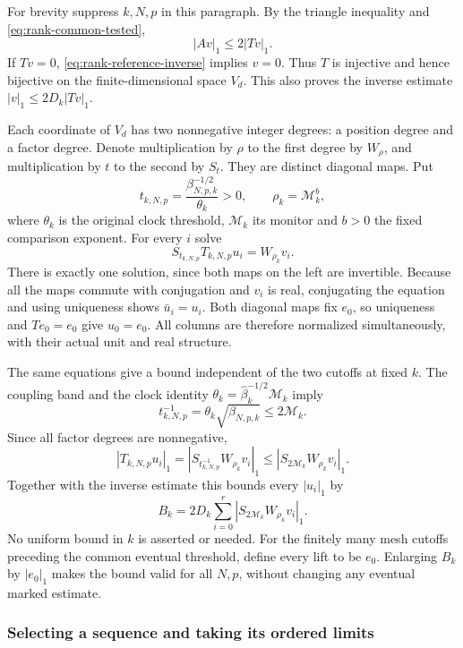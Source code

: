 For brevity suppress $k,N,p$ in this paragraph. By the triangle inequality
and \eqref{eq:rank-common-tested},
\[
                         |Av|_1\le2|Tv|_1.
\]
If $Tv=0$, \eqref{eq:rank-reference-inverse} implies $v=0$.
Thus $T$ is injective and hence bijective on the finite-dimensional space
$V_d$. This also proves the inverse estimate $|v|_1\le2D_k|Tv|_1$.

Each coordinate of $V_d$ has two nonnegative integer degrees: a position
degree and a factor degree. Denote multiplication by $\rho$ to the first
degree by $W_\rho$, and multiplication by $t$ to the second by $S_t$.
They are distinct diagonal maps. Put
\[
 t_{k,N,p}=\frac{\beta_{N,p,k}^{-1/2}}{\theta_k}>0,
 \qquad \rho_k=\mathcal M_k^b,
\]
where $\theta_k$ is the original clock threshold, $\mathcal M_k$ its
monitor and $b>0$ the fixed comparison exponent. For every $i$ solve
\begin{equation}\label{eq:rank-common-lifts}
                  S_{t_{k,N,p}}T_{k,N,p}u_i=W_{\rho_k}v_i.
\end{equation}
There is exactly one solution, since both maps on the left are
invertible. Because all the maps commute with conjugation and $v_i$ is
real, conjugating the equation and using uniqueness shows $\bar u_i=u_i$.
Both diagonal maps fix $e_0$, so uniqueness and $Te_0=e_0$ give $u_0=e_0$.
All columns are therefore normalized simultaneously, with their actual
unit and real structure.

The same equations give a bound independent of the two cutoffs at fixed
$k$. The coupling band and the clock identity
$\theta_k=\widehat\beta_k^{-1/2}\mathcal M_k$ imply
\[
            t_{k,N,p}^{-1}
            =\theta_k\sqrt{\beta_{N,p,k}}\le2\mathcal M_k.
\]
Since all factor degrees are nonnegative,
\[
 |T_{k,N,p}u_i|_1
 =|S_{t_{k,N,p}^{-1}}W_{\rho_k}v_i|_1
 \le |S_{2\mathcal M_k}W_{\rho_k}v_i|_1.
\]
Together with the inverse estimate this bounds every $|u_i|_1$ by
\begin{equation}\label{eq:rank-fixed-scale-bounded}
            B_k=2D_k\sum_{i=0}^r
                        |S_{2\mathcal M_k}W_{\rho_k}v_i|_1.
\end{equation}
No uniform bound in $k$ is asserted or needed. For the finitely many mesh
cutoffs preceding the common eventual threshold, define every lift to be
$e_0$. Enlarging $B_k$ by $|e_0|_1$ makes the bound valid for all $N,p$,
without changing any eventual marked estimate.

\subsubsection{Selecting a sequence and taking its ordered limits}

